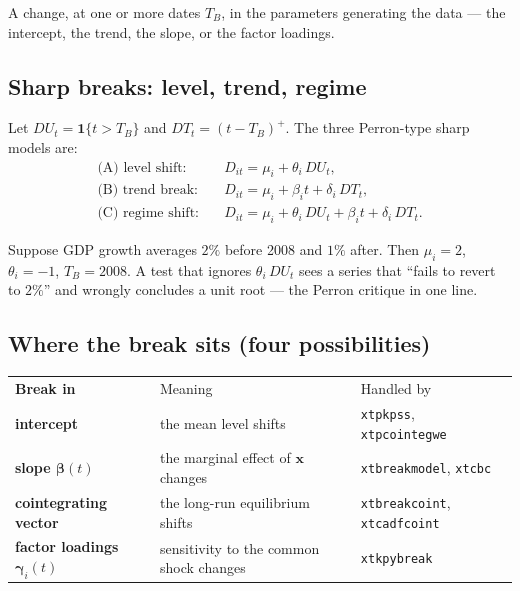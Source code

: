 \documentclass[11pt,a4paper]{article}
\newcommand{\cmd}[1]{\texttt{\textcolor{camber}{#1}}}
\newcommand{\bbeta}{\boldsymbol{\beta}}
\newcommand{\bgamma}{\boldsymbol{\gamma}}
\newcommand{\bx}{\mathbf{x}}
\theoremstyle{definition}
\begin{document}
\begin{definition}
A change, at one or more dates $T_B$, in the parameters generating the data --- the intercept, the
trend, the slope, or the factor loadings.
\end{definition}

\subsection{Sharp breaks: level, trend, regime}
Let $DU_t=\mathbf 1\{t>T_B\}$ and $DT_t=(t-T_B)^+$. The three Perron-type sharp models are:
\begin{align}
\text{(A) level shift:}\quad & D_{it}=\mu_i+\theta_i\,DU_t,\\
\text{(B) trend break:}\quad & D_{it}=\mu_i+\beta_i t+\delta_i\,DT_t,\\
\text{(C) regime shift:}\quad & D_{it}=\mu_i+\theta_i\,DU_t+\beta_i t+\delta_i\,DT_t.
\end{align}
\begin{exbox}
Suppose GDP growth averages $2\%$ before 2008 and $1\%$ after. Then $\mu_i=2$, $\theta_i=-1$,
$T_B=2008$. A test that ignores $\theta_i\,DU_t$ sees a series that ``fails to revert to $2\%$'' and
wrongly concludes a unit root --- the Perron critique in one line.
\end{exbox}

\subsection{Where the break sits (four possibilities)}
\begin{center}
\begin{tabular}{@{}>{\bfseries}l p{7.6cm} l@{}}
\rowcolor{camber}\color{white}Break in & \color{white}Meaning & \color{white}Handled by\\
intercept & the mean level shifts & \cmd{xtpkpss}, \cmd{xtpcointegwe}\\
slope $\bbeta(t)$ & the marginal effect of $\bx$ changes & \cmd{xtbreakmodel}, \cmd{xtcbc}\\
cointegrating vector & the long-run equilibrium shifts & \cmd{xtbreakcoint}, \cmd{xtcadfcoint}\\
factor loadings $\bgamma_i(t)$ & sensitivity to the common shock changes & \cmd{xtkpybreak}\\
\end{tabular}
\end{center}
\end{document}
